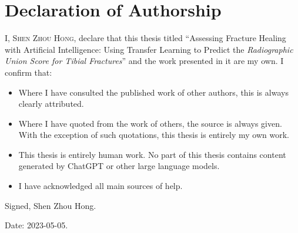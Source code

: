 \chapter{Declaration of Authorship}

I, \textsc{Shen Zhou Hong}, declare that this thesis titled \enquote{Assessing Fracture Healing with Artificial Intelligence: Using Transfer Learning to Predict the \emph{Radiographic Union Score for Tibial Fractures}} and the work presented in it are my own. I confirm that:

\begin{itemize}
    \item Where I have consulted the published work of other authors, this is always clearly attributed.
    \item Where I have quoted from the work of others, the source is always given. With the exception of such quotations, this thesis is entirely my own work.
    \item This thesis is entirely human work. No part of this thesis contains content generated by ChatGPT or other large language models.
    \item I have acknowledged all main sources of help.
\end{itemize}

\noindent
Signed, Shen Zhou Hong.

\vspace{3\baselineskip}

\noindent
Date: 2023-05-05.
